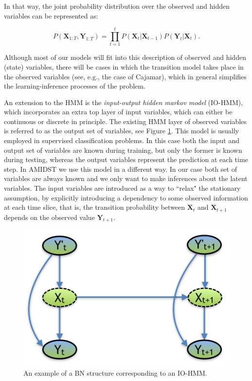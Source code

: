 In that way, the joint probability distribution over the observed and hidden variables can be represented as:

\begin{equation}
P(\bm X_{1:T},\bm Y_{1:T}) = \prod_{t=1}^t{P(\bm X_t| \bm X_{t-1})P(\bm Y_t|\bm X_t)}.
\end{equation}

Although most of our models will fit into this description of observed and hidden (state) variables, there will be cases in which the transition model takes place in the observed variables (see, e.g., the case of Cajamar), which in general simplifies the learning-inference processes of the problem.

An extension to the HMM is the \textit{input-output hidden markov model} (IO-HMM), which incorporates an extra top layer of input variables, which can either be continuous or discrete in principle. The existing HMM layer of observed variables is referred to as the output set of variables, see Figure \ref{Figure:IO-HMM}. This model is usually employed in supervised classification problems. In this case both the input and output set of variables are known during training, but only the former is known during testing, whereas the output variables represent the prediction at each time step. In AMIDST we use this model in a different way. In our case both set of variables are always known and we only want to make inferences about the latent variables. The input variables are introduced as a way to ``relax" the stationary assumption, by explicitly introducing a dependency to some observed information at each time slice, that is, the transition probability between $\bm X_t$ and $\bm X_{t+1}$ depends on the observed value $\bm Y_{t+1}$. 

\begin{figure}[ht!]
\begin{center}
\includegraphics[scale=0.4]{./figures/PreliminariesIO-HMM}
\caption{\label{Figure:IO-HMM}An example of a BN structure corresponding to an IO-HMM.}
\end{center}
\end{figure}

